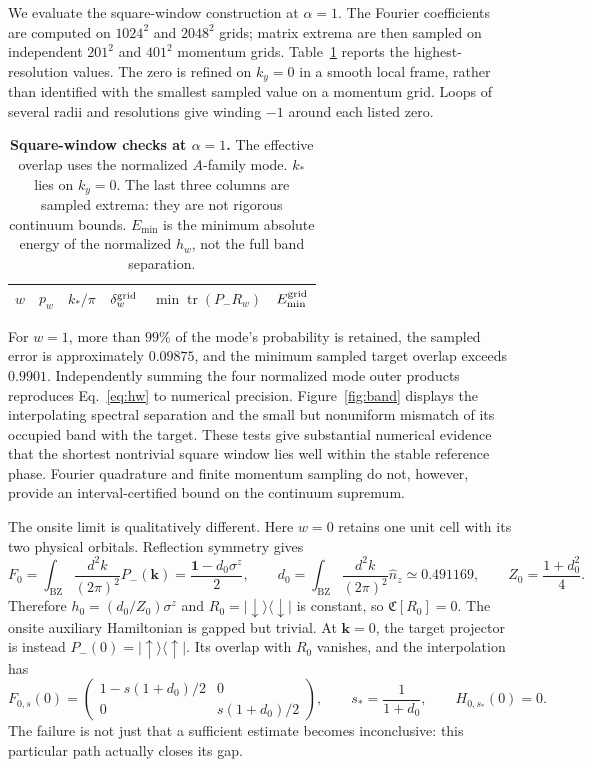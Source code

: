 \documentclass[aps,prb,onecolumn,nofootinbib,superscriptaddress]{revtex4-2}
\newcommand{\id}{\mathbf{1}}
\newcommand{\tr}{\operatorname{tr}}
\newcommand{\Ch}{\mathfrak C}
\newcommand{\bk}{\boldsymbol k}
\newcommand{\ket}[1]{\lvert#1\rangle}
\newcommand{\bra}[1]{\langle#1\rvert}
\newcommand{\intk}{\int_{\mathrm{BZ}}\frac{d^2k}{(2\pi)^2}}
\begin{document}
We evaluate the square-window construction at $\alpha=1$. The Fourier
coefficients are computed on $1024^2$ and $2048^2$ grids; matrix extrema are
then sampled on independent $201^2$ and $401^2$ momentum grids. Table~\ref{tab:checks}
reports the highest-resolution values. The zero is refined on $k_y=0$ in a
smooth local frame, rather than identified with the smallest sampled value
on a momentum grid. Loops of several radii and resolutions give winding
$-1$ around each listed zero.

\begin{table}[t]
 \caption{\textbf{Square-window checks at $\alpha=1$.} The effective overlap
 uses the normalized $A$-family mode. $k_*$ lies on $k_y=0$. The last three
 columns are sampled extrema: they are not rigorous continuum bounds.
 $E_{\min}$ is the minimum absolute energy of the normalized $h_w$, not the
 full band separation.}
 \label{tab:checks}
 \begin{ruledtabular}
 \begin{tabular}{cccccc}
 $w$ & $p_w$ & $k_*/\pi$ & $\delta_w^{\rm grid}$ & $\min\tr(P_-R_w)$ & $E_{\min}^{\rm grid}$\\
 \hline
 
 \end{tabular}
 \end{ruledtabular}
\end{table}

For $w=1$, more than $99\%$ of the mode's probability is retained, the
sampled error is approximately $0.09875$, and the minimum sampled target
overlap exceeds $0.9901$. Independently summing the four normalized mode
outer products reproduces Eq.~\eqref{eq:hw} to numerical precision.
Figure~\ref{fig:band} displays the interpolating spectral separation and
the small but nonuniform mismatch of its occupied band with the target.
These tests give substantial numerical evidence that the shortest nontrivial
square window lies well within the stable reference phase. Fourier quadrature
and finite momentum sampling do not, however, provide an interval-certified
bound on the continuum supremum.

The onsite limit is qualitatively different. Here $w=0$ retains one unit
cell with its two physical orbitals. Reflection symmetry gives
\begin{equation}
 F_0=\intk P_-(\bk)=\frac{\id-d_0\sigma^z}{2},\qquad
 d_0=\intk\widehat n_z\simeq0.491169,
 \qquad Z_0=\frac{1+d_0^2}{4}.
 \label{eq:onsite}
\end{equation}
Therefore $h_0=(d_0/Z_0)\sigma^z$ and
$R_0=\ket{\downarrow}\bra{\downarrow}$ is constant, so
$\Ch[R_0]=0$. The onsite auxiliary Hamiltonian is gapped but trivial.
At $\bk=0$, the target projector is instead
$P_-(0)=\ket{\uparrow}\bra{\uparrow}$. Its overlap with $R_0$ vanishes,
and the interpolation has
\begin{equation}
 F_{0,s}(0)=
 \begin{pmatrix}1-s(1+d_0)/2&0\\0&s(1+d_0)/2\end{pmatrix},
 \qquad s_*=\frac1{1+d_0},\qquad H_{0,s_*}(0)=0.
 \label{eq:crossing}
\end{equation}
The failure is not just that a sufficient estimate becomes inconclusive:
this particular path actually closes its gap.
\end{document}
